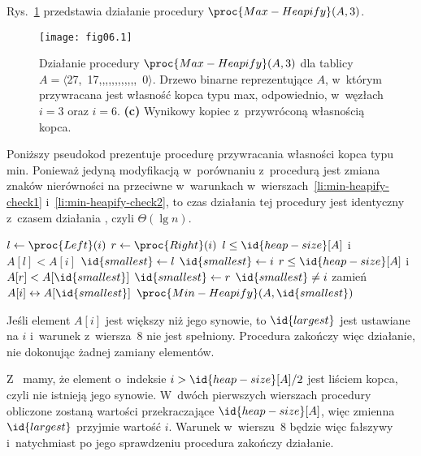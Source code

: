 
\exercise %
Rys.~\ref{fig:6.2-1} przedstawia działanie procedury $\proc{Max-Heapify}(A,3)$.
\begin{figure}[ht]
	\begin{center}
		\texttt{[image: fig06.1]}
	\end{center}
	\caption{Działanie procedury $\proc{Max-Heapify}(A,3)$ dla tablicy $A=\langle$27,\!~17,,,,,,,,,,,,\!~0$\rangle$. {\sffamily\bfseries{}} Drzewo binarne reprezentujące $A$, w~którym przywracana jest własność kopca typu max, odpowiednio, w~węzłach $i=3$ oraz $i=6$. {\sffamily\bfseries(c)} Wynikowy kopiec z~przywróconą własnością kopca.} \label{fig:6.2-1}
\end{figure}

\exercise %
Poniższy pseudokod prezentuje procedurę przywracania własności kopca typu min. Ponieważ jedyną modyfikacją w~porównaniu z~procedurą  jest zmiana znaków nierówności na przeciwne w~warunkach w~wierszach~\ref{li:min-heapify-check1} i~\ref{li:min-heapify-check2}, to czas działania tej procedury jest identyczny z~czasem działania , czyli $\Theta(\lg n)$.
\begin{codebox}
\li	$l\gets\proc{Left}(i)$
\li	$r\gets\proc{Right}(i)$
\li	\If $l\le\id{heap-size}[A]$ i~$A[l]<A[i]$ \label{li:min-heapify-check1}
\li		\Then $\id{smallest}\gets l$
\li		\Else $\id{smallest}\gets i$
		\End
\li	\If $r\le\id{heap-size}[A]$ i~$A[r]<A[\id{smallest}]$ \label{li:min-heapify-check2}
\li		\Then $\id{smallest}\gets r$
		\End
\li	\If $\id{smallest}\ne i$
\li		\Then
			zamień $A[i]\leftrightarrow A[\id{smallest}]$
\li			$\proc{Min-Heapify}(A,\id{smallest})$
		\End
\end{codebox}

\exercise %
Jeśli element $A[i]$ jest większy niż jego synowie, to $\id{largest}$ jest ustawiane na $i$ i~warunek z~wiersza~8 nie jest spełniony. Procedura zakończy więc działanie, nie dokonując żadnej zamiany elementów.

\exercise %
Z~ mamy, że element o~indeksie $i>\id{heap-size}[A]/2$ jest liściem kopca, czyli nie istnieją jego synowie. W~dwóch pierwszych wierszach procedury  obliczone zostaną wartości przekraczające $\id{heap-size}[A]$, więc zmienna $\id{largest}$ przyjmie wartość $i$. Warunek w~wierszu~8 będzie więc fałszywy i~natychmiast po jego sprawdzeniu procedura zakończy działanie.


